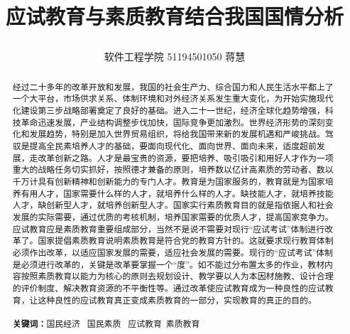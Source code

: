 \documentclass[UTF8]{ctexart}
\begin{document}
	\title{\textbf{应试教育与素质教育结合我国国情分析}\\[1ex]\begin{large}
		\end{large}}
	\author{软件工程学院 51194501050 蒋慧}
	\maketitle
\begin{abstract}
	经过二十多年的改革开放和发展，我国的社会生产力、综合国力和人民生活水平都上了一个大平台，市场供求关系、体制环境和对外经济关系发生重大变化，为开始实施现代化建设第三步战略部署奠定了良好的基础。进入二十一世纪，经济全球化趋势增强，科技革命迅速发展，产业结构调整步伐加快，国际竞争更加激烈。世界经济形势的深刻变化和发展趋势，特别是加入世界贸易组织，将给我国带来新的发展机遇和严峻挑战。驾驭是提高全民素培养人才的基础，要面向现代化、面向世界、面向未来，适度超前发展，走改革创新之路。人才是最宝贵的资源，要把培养、吸引吸引和用好人才作为一项重大的战略任务切实抓好，按照德才兼备的原则，培养数以亿计高素质的劳动者、数以千万计具有创新精神和创新能力的专门人才。教育是为国家服务的，教育就是为国家培养有用人才，国家需要什么样的人才，就培养什么样的人才。缺技能人才，就培养技能人才，缺创新型人才，就培养创新型人才。国家实行素质教育目的就是指依据人和社会发展的实际需要，通过优质的考核机制，培养国家需要的优质人才，提高国家竞争力。应试教育应是素质教育重要组成部分，当然不是说不需要对现行“应试考试”体制进行改革了。国家提倡素质教育说明素质教育是符合党的教育方针的。这就要求现行教育体制必须作出改革，以适应国家发展的需要，适应社会发展的需要。现行的“应试考试”体制是必须进行改革的，关键是改革要掌握一个“度”\textsuperscript{\cite{CZJ}}。如不能过分布置太多的作业，教材内容按照素质教育以能力为核心的原则去规划设计、教学要以人为本因材施教、设计合理的评价制度、解决教育资源的不平衡性等。通过改革使应试教育成为一种良性的应试教育，让这种良性的应试教育真正变成素质教育的一部分，实现教育的真正的目的。\\
	\\
	\textbf{关键词：}国民经济 \, 国民素质 \,  应试教育\, 素质教育
\end{abstract}
\end{document}
